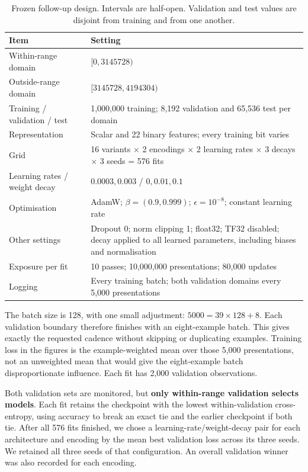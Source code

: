 \documentclass{article}
\begin{document}
\begin{table}[h!]
\centering
\caption{Frozen follow-up design. Intervals are half-open. Validation and test
values are disjoint from training and from one another.}
\small
\begin{tabular}{p{2.0in}p{3.0in}}
\toprule
Item & Setting\\
\midrule
Within-range domain & $[0,3145728)$\\
Outside-range domain & $[3145728,4194304)$\\
Training / validation / test & 1,000,000 training; 8,192 validation and 65,536 test per domain\\
Representation & Scalar and 22 binary features; every training bit varies\\
Grid & 16 variants $\times$ 2 encodings $\times$ 2 learning rates $\times$ 3 decays $\times$ 3 seeds = 576 fits\\
Learning rates / weight decay & $0.0003,0.003$ / $0,0.01,0.1$\\
Optimisation & AdamW; $\beta=(0.9,0.999)$; $\epsilon=10^{-8}$; constant learning rate\\
Other settings & Dropout 0; norm clipping 1; float32; TF32 disabled; decay applied to all learned parameters, including biases and normalisation\\
Exposure per fit & 10 passes; 10,000,000 presentations; 80,000 updates\\
Logging & Every training batch; both validation domains every 5,000 presentations\\
\bottomrule
\end{tabular}
\end{table}

The batch size is 128, with one small adjustment: $5000=39\times128+8$. Each
validation boundary therefore finishes with an eight-example batch. This gives
exactly the requested cadence without skipping or duplicating examples. Training
loss in the figures is the example-weighted mean over those 5,000 presentations,
not an unweighted mean that would give the eight-example batch disproportionate
influence. Each fit has 2,000 validation observations.

Both validation sets are monitored, but \textbf{only within-range validation selects
models}. Each fit retains the checkpoint with the lowest within-validation
cross-entropy, using accuracy to break an exact tie and the earlier checkpoint
if both tie. After all 576 fits finished, we chose a learning-rate/weight-decay pair
for each architecture and encoding by the mean best validation loss across its
three seeds. We retained all three seeds of that configuration. An overall
validation winner was also recorded for each encoding.
\end{document}
